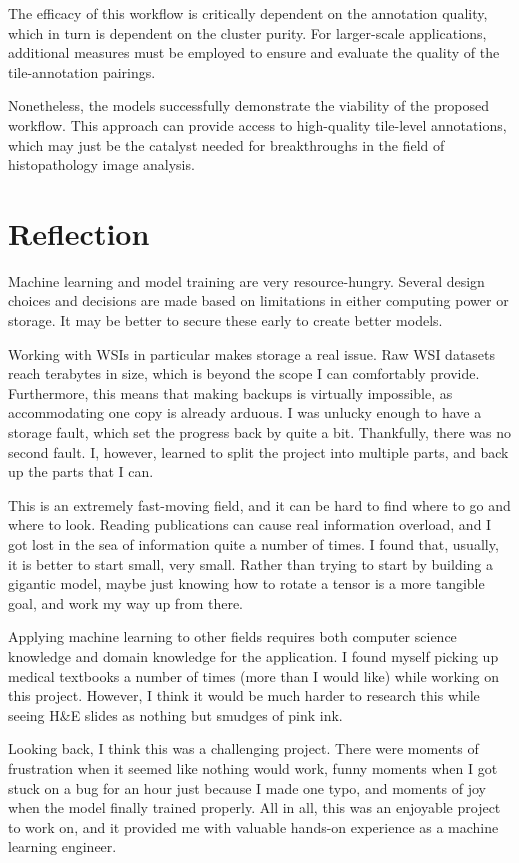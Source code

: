 \documentclass{l4proj}
\begin{document}
The efficacy of this workflow is critically dependent on the annotation quality, which in turn is dependent on the cluster purity. For larger-scale applications, additional measures must be employed to ensure and evaluate the quality of the tile-annotation pairings.

Nonetheless, the models successfully demonstrate the viability of the proposed workflow. This approach can provide access to high-quality tile-level annotations, which may just be the catalyst needed for breakthroughs in the field of histopathology image analysis.

\section{Reflection}
Machine learning and model training are very resource-hungry. Several design choices and decisions are made based on limitations in either computing power or storage. It may be better to secure these early to create better models.

Working with WSIs in particular makes storage a real issue. Raw WSI datasets reach terabytes in size, which is beyond the scope I can comfortably provide. Furthermore, this means that making backups is virtually impossible, as accommodating one copy is already arduous. I was unlucky enough to have a storage fault, which set the progress back by quite a bit. Thankfully, there was no second fault. I, however, learned to split the project into multiple parts, and back up the parts that I can.

This is an extremely fast-moving field, and it can be hard to find where to go and where to look. Reading publications can cause real information overload, and I got lost in the sea of information quite a number of times. I found that, usually, it is better to start small, very small. Rather than trying to start by building a gigantic model, maybe just knowing how to rotate a tensor is a more tangible goal, and work my way up from there.

Applying machine learning to other fields requires both computer science knowledge and domain knowledge for the application. I found myself picking up medical textbooks a number of times (more than I would like) while working on this project. However, I think it would be much harder to research this while seeing H\&E slides as nothing but smudges of pink ink.

Looking back, I think this was a challenging project. There were moments of frustration when it seemed like nothing would work, funny moments when I got stuck on a bug for an hour just because I made one typo, and moments of joy when the model finally trained properly. All in all, this was an enjoyable project to work on, and it provided me with valuable hands-on experience as a machine learning engineer.
\end{document}
